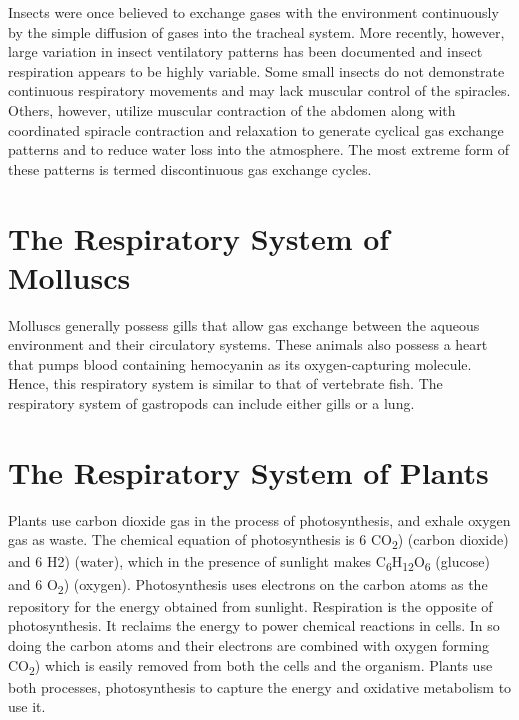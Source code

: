 Insects were once believed to exchange gases with the environment continuously by the simple diffusion of gases into the tracheal system. More recently, however, large variation in insect ventilatory patterns has been documented and insect respiration appears to be highly variable. Some small insects do not demonstrate continuous respiratory movements and may lack muscular control of the spiracles. Others, however, utilize muscular contraction of the abdomen along with coordinated spiracle contraction and relaxation to generate cyclical gas exchange patterns and to reduce water loss into the atmosphere. The most extreme form of these patterns is termed discontinuous gas exchange cycles.

\hypertarget{the-respiratory-system-of-molluscs}{%
\section{The Respiratory System of Molluscs}\label{the-respiratory-system-of-molluscs}}

Molluscs generally possess gills that allow gas exchange between the aqueous environment and their circulatory systems. These animals also possess a heart that pumps blood containing hemocyanin as its oxygen-capturing molecule. Hence, this respiratory system is similar to that of vertebrate fish. The respiratory system of gastropods can include either gills or a lung.

\hypertarget{the-respiratory-system-of-plants}{%
\section{The Respiratory System of Plants}\label{the-respiratory-system-of-plants}}

Plants use carbon dioxide gas in the process of photosynthesis, and exhale oxygen gas as waste. The chemical equation of photosynthesis is 6 CO\textsubscript{2}) (carbon dioxide) and 6 H2) (water), which in the presence of sunlight makes C\textsubscript{6}H\textsubscript{12}O\textsubscript{6} (glucose) and 6 O\textsubscript{2}) (oxygen). Photosynthesis uses electrons on the carbon atoms as the repository for the energy obtained from sunlight. Respiration is the opposite of photosynthesis. It reclaims the energy to power chemical reactions in cells. In so doing the carbon atoms and their electrons are combined with oxygen forming CO\textsubscript{2}) which is easily removed from both the cells and the organism. Plants use both processes, photosynthesis to capture the energy and oxidative metabolism to use it.

